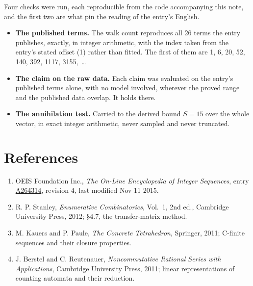 \documentclass[11pt]{article}
\theoremstyle{definition}
\begin{document}
Four checks were run, each reproducible from the code accompanying this note, and the first two are what pin the reading of the entry's English.

\begin{itemize}

\item {\bfseries The published terms.} The walk count reproduces all 26 terms the entry publishes, exactly, in integer arithmetic, with the index taken from the entry's stated offset (1) rather than fitted. The first of them are 1, 6, 20, 52, 140, 392, 1117, 3155,~\dots

\item {\bfseries The claim on the raw data.} Each claim was evaluated on the entry's published terms alone, with no model involved, wherever the proved range and the published data overlap. It holds there.

\item {\bfseries The annihilation test.} Carried to the derived bound $S = 15$ over the whole vector, in exact integer arithmetic, never sampled and never truncated.

\end{itemize}

\section{References}

\begin{enumerate}

\item OEIS Foundation Inc., \emph{The On-Line Encyclopedia of Integer Sequences}, entry \href{https://oeis.org/A264314}{A264314}, revision 4, last modified Nov 11 2015.

\item R. P. Stanley, \emph{Enumerative Combinatorics}, Vol.~1, 2nd ed., Cambridge University Press, 2012; \S4.7, the transfer-matrix method.

\item M. Kauers and P. Paule, \emph{The Concrete Tetrahedron}, Springer, 2011; C-finite sequences and their closure properties.

\item J. Berstel and C. Reutenauer, \emph{Noncommutative Rational Series with Applications}, Cambridge University Press, 2011; linear representations of counting automata and their reduction.

\end{enumerate}
\end{document}
